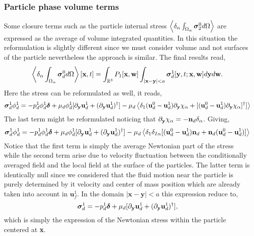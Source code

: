 \subsubsection{Particle phase volume terms}

Some closure terms such as the particle internal stress $\left<\delta_\alpha \int_{\Omega_\alpha} \bm{\sigma}_2^0 d\Omega\right>$ are expressed as the average of volume integrated quantities. 
In this situation the reformulation is slightly different since we must consider volume and not surfaces of the particle nevertheless the approach is similar. 
The final results read, 
\begin{equation}
    \left<\delta_\alpha \int_{\Omega_\alpha} \bm\sigma_d^0 d\Omega\right>[\textbf{x},t]
    =
    \int_{\mathbb{R}^3}
    P_1[\textbf{x},\textbf{w}]
    \int_{|\textbf{x}-\textbf{y}|<a}
    \bm\sigma_d^1[\textbf{y},t;\textbf{x},\textbf{w}] 
    d\textbf{y}
    d\textbf{w}. 
    \label{eq:conditionally_averaged_vol}
\end{equation}
Here the stress can be reformulated as well, it reads, 
\begin{equation*}
    \bm\sigma_d^1\phi_d^1  
    = 
    -p_d^1 \phi_d^1  \bm\delta
    + \mu_d 
    \phi_d^1 
     [{\partial_\textbf{y}} \textbf{u}^1_d+({\partial_\textbf{y}}  \textbf{u}^1_d)^\dagger]
     - \mu_d
     \left<
         \delta_1
         (\textbf{u}_d^0 - \textbf{u}_d^1)
         {\partial_\textbf{y}}  \chi_{\alpha}
         + 
         [(\textbf{u}_d^0 - \textbf{u}_d^1)
            {\partial_\textbf{y}}  \chi_{\alpha}]^\dagger
         ]
         \right>
\end{equation*}
The last term might be reformulated noticing that ${\partial_\textbf{y}}  \chi_\alpha = - \textbf{n}_d \delta_{\alpha}$. 
Giving, 
\begin{equation*}
    \bm\sigma_d^1\phi_d^1  
    = 
    -p_d^1 \phi_d^1  \bm\delta
    + \mu_d \phi_d^1 [{\partial_\textbf{y}} \textbf{u}^1_d+({\partial_\textbf{y}}  \textbf{u}^1_d)^\dagger]
     - \mu_d
     \left<
         \delta_1
         \delta_{I\alpha}
         [(\textbf{u}_d^0 - \textbf{u}_d^1) \textbf{n}_d 
         + \textbf{n}_d (\textbf{u}_d^0 - \textbf{u}_d^1)]
         \right>
\end{equation*}
Notice that the first term is simply the average Newtonian part of the stress while the second term arise due to velocity fluctuation between the conditionally averaged field and the local field at the surface of the particles. 
The latter term is identically null since we considered that the fluid motion near the particle is purely determined by it velocity and center of mass position which are already taken into account in $\textbf{u}_f^1$. 
In the domain $|\textbf{x} - \textbf{y}| < a$ this expression reduce to, 
\begin{equation*}
    \bm\sigma_d^1  
    = 
    -p_d^1   \bm\delta
    + \mu_d  [{\partial_\textbf{y}} \textbf{u}^1_d+({\partial_\textbf{y}}  \textbf{u}^1_d)^\dagger],
\end{equation*}
which is simply the expression of the Newtonian stress within the particle centered at \textbf{x}. 

